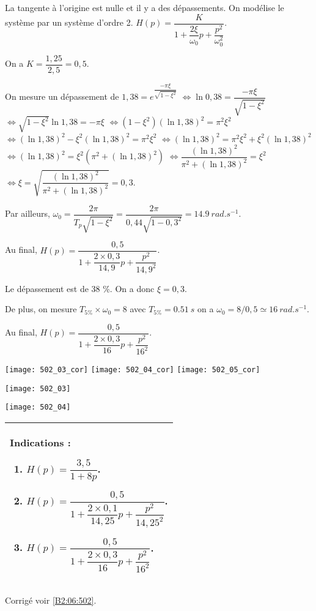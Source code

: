 La tangente à l'origine est nulle et il y a des dépassements. On modélise le système par un système d'ordre 2. 
$H(p)=\dfrac{K}{1+\dfrac{2\xi}{\omega_0}p+\dfrac{p^2}{\omega_0^2}}$.

On a $K= \dfrac{1,25}{2,5}=0,5$.


On mesure un dépassement de 
$1,38 = e^{\dfrac{-\pi \xi}{\sqrt{1-\xi^2}}}$
$\Leftrightarrow \ln 0,38 = \dfrac{-\pi \xi}{\sqrt{1-\xi^2}}$
$\Leftrightarrow \sqrt{1-\xi^2} \ln 1,38 = -\pi \xi$
$\Leftrightarrow (1-\xi^2) (\ln 1,38)^2= \pi^2 \xi^2$
$\Leftrightarrow (\ln 1,38)^2-\xi^2(\ln 1,38)^2 = \pi^2 \xi^2$
$\Leftrightarrow (\ln 1,38)^2 = \pi^2 \xi^2 + \xi^2(\ln 1,38)^2$
$\Leftrightarrow (\ln 1,38)^2 =\xi^2 \left(\pi^2  + (\ln 1,38)^2\right)$
$\Leftrightarrow \dfrac{(\ln 1,38)^2}{\pi^2  + (\ln 1,38)^2} =\xi^2 $
$\Leftrightarrow \xi = \sqrt{\dfrac{(\ln 1,38)^2}{\pi^2  +(\ln 1,38)^2}} =0,3 $.


Par ailleurs, $\omega_0 = \dfrac{2\pi }{T_p \sqrt{1-\xi^2}} =\dfrac{2\pi }{0,44 \sqrt{1-0,3^2}} = \SI{14,9}{rad.s^{-1}}$.

Au final, $H(p)=\dfrac{0,5}{1+\dfrac{2\times 0,3}{14,9}p+\dfrac{p^2}{14,9^2}}$.


\else
\fi



\ifprof
Le dépassement est de 38 \%. On a donc $\xi = 0,3$.

De plus, on mesure $T_{5\%}\times \omega_0 =8$ avec $T_{5\%}=\SI{0,51}{s}$ on a $\omega_0 = 8/0,5 \simeq \SI{16}{rad.s^{-1}}$.

Au final, $H(p)=\dfrac{0,5}{1+\dfrac{2\times 0,3}{16}p+\dfrac{p^2}{16^2}}$.
\begin{center}
\texttt{[image: 502\_03\_cor]}
\texttt{[image: 502\_04\_cor]}
\texttt{[image: 502\_05\_cor]}
\end{center}
\else
\begin{center}
\texttt{[image: 502\_03]}
\end{center}
\begin{center}
\texttt{[image: 502\_04]}
\end{center}
\fi


\ifprof
\else
\footnotesize
\begin{tabular}{|p{.9\linewidth}|}
\hline
Indications :
\begin{enumerate}
\item  $H(p)=\dfrac{3,5}{1+8p}$.
\item $H(p)=\dfrac{0,5}{1+\dfrac{2\times 0,1}{14,25}p+\dfrac{p^2}{14,25^2}}$.
\item $H(p)=\dfrac{0,5}{1+\dfrac{2\times 0,3}{16}p+\dfrac{p^2}{16^2}}$.
\end{enumerate} \\ \hline
\end{tabular}
\normalsize

\begin{flushright}
\footnotesize{Corrigé  voir \ref{B2:06:502}.}
\end{flushright}%
\fi